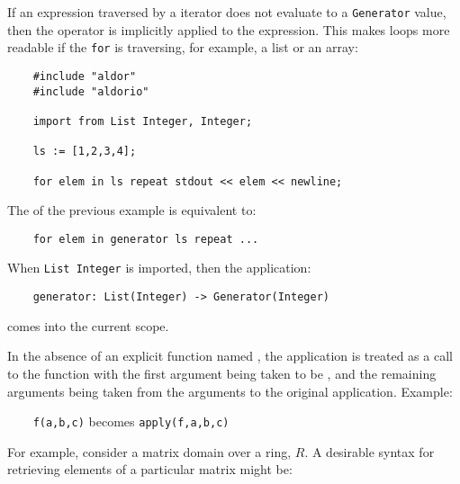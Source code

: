 
If an expression traversed by a  iterator does not evaluate
to a {\tt Generator} value, then the operator  is
implicitly applied to the expression. This makes loops more readable
if the {\tt for} is traversing, for example, a list or an array:

\begin{small}%
\begin{verbatim}
    #include "aldor"
    #include "aldorio"

    import from List Integer, Integer;

    ls := [1,2,3,4];

    for elem in ls repeat stdout << elem << newline;
\end{verbatim}
\end{small}

The  of the previous example is
equivalent to:

\begin{small}
\begin{verbatim}
    for elem in generator ls repeat ...
\end{verbatim}
\end{small}

When {\tt List Integer} is imported, then the application:

{\small \verb^    generator: List(Integer) -> Generator(Integer)^}

comes into the current scope.



In the absence of an explicit function named , the application
 is treated as a call to the function  with the
first argument being taken to be , and the remaining arguments
being taken from the arguments to the original application.
Example:

\verb^    ^{\tt f(a,b,c)} becomes {\tt apply(f,a,b,c)}

For example, consider a matrix domain over a ring, $R$. A desirable
syntax for retrieving elements of a particular matrix might be:

